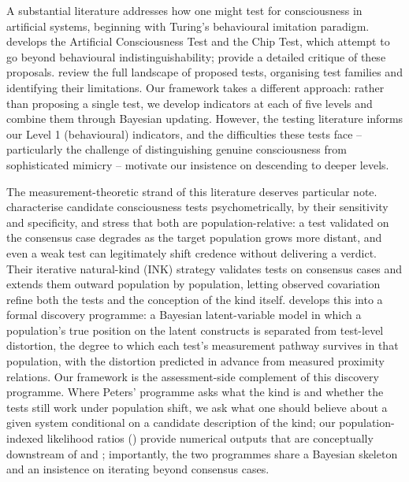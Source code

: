 \documentclass[11pt, a4paper, onecolumn, gdm]{google}
\begin{document}
A substantial literature addresses how one might test for consciousness in artificial systems, beginning with Turing's \citeyearpar{turing1950} behavioural imitation paradigm.
\citet{schneider2020} develops the Artificial Consciousness Test and the Chip Test, which attempt to go beyond behavioural indistinguishability; \citet{udell2021} provide a detailed critique of these proposals.
\citet{elamrani2019} review the full landscape of proposed tests, organising test families and identifying their limitations.
Our framework takes a different approach: rather than proposing a single test, we develop indicators at each of five levels and combine them through Bayesian updating.
However, the testing literature informs our Level 1 (behavioural) indicators, and the difficulties these tests face -- particularly the challenge of distinguishing genuine consciousness from sophisticated mimicry -- motivate our insistence on descending to deeper levels.

The measurement-theoretic strand of this literature deserves particular note.
\citet{bayne2024} characterise candidate consciousness tests psychometrically, by their sensitivity and specificity, and stress that both are population-relative: a test validated on the consensus case degrades as the target population grows more distant, and even a weak test can legitimately shift credence without delivering a verdict.
Their iterative natural-kind (INK) strategy validates tests on consensus cases and extends them outward population by population, letting observed covariation refine both the tests and the conception of the kind itself.
\citet{peters2026} develops this into a formal discovery programme: a Bayesian latent-variable model in which a population's true position on the latent constructs is separated from test-level distortion, the degree to which each test's measurement pathway survives in that population, with the distortion predicted in advance from measured proximity relations.
Our framework is the assessment-side complement of this discovery programme.
Where Peters' programme asks what the kind is and whether the tests still work under population shift, we ask what one should believe about a given system conditional on a candidate description of the kind; our population-indexed likelihood ratios () provide numerical outputs that are conceptually downstream of \citet{peters2026} and \citet{bayne2024}; importantly, the two programmes share a Bayesian skeleton and an insistence on iterating beyond consensus cases.
\end{document}

